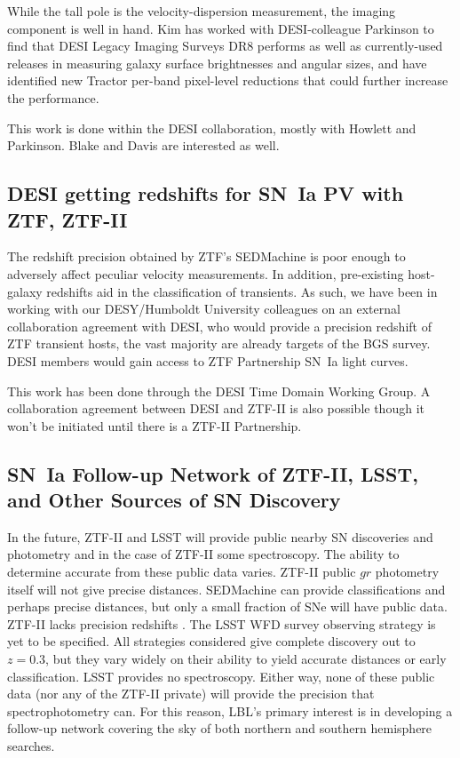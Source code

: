 While the tall pole is the velocity-dispersion measurement, the
imaging component is well in hand. Kim has worked with DESI-colleague Parkinson to find that DESI Legacy Imaging Surveys DR8  performs
as well as currently-used releases in measuring galaxy surface brightnesses and angular sizes, and have identified new Tractor
per-band
pixel-level reductions that could further increase the performance.

This work is done within the DESI collaboration, mostly with Howlett and Parkinson.  Blake and Davis are interested as well.

\subsection{DESI getting redshifts for SN~Ia PV with ZTF, ZTF-II}
The redshift precision obtained by ZTF's SEDMachine is poor enough
to adversely affect peculiar velocity measurements.  In addition, pre-existing host-galaxy redshifts
 aid in the classification of transients.  As such, we have been in working with our DESY/Humboldt University
colleagues on an external collaboration agreement with DESI, who would provide a precision redshift of ZTF transient hosts,
the vast majority are already targets of the BGS survey.   DESI members would gain access to ZTF Partnership
SN~Ia light curves.

This work has been done through the DESI Time Domain Working Group.
A collaboration agreement between DESI and ZTF-II is also possible though it won't be initiated until there is a ZTF-II Partnership.

\subsection{SN~Ia Follow-up Network of ZTF-II, LSST, and Other Sources of SN Discovery}
In the future, ZTF-II and LSST will provide public nearby SN discoveries and photometry and in the case of ZTF-II some spectroscopy.
The ability to determine accurate from these public data varies.  ZTF-II public $gr$ photometry itself will not give precise distances.
SEDMachine can provide classifications and perhaps precise distances, but only a small fraction of SNe will have public data.
ZTF-II lacks precision redshifts .
The LSST WFD survey observing strategy is yet to be specified.  All strategies considered give complete discovery out to $z=0.3$, but
they vary widely on their ability to yield accurate distances or early classification.  LSST provides no spectroscopy. Either way, none of these public data
(nor any of the ZTF-II private) will provide the precision that spectrophotometry can.  For this reason, LBL's primary interest
is in developing a follow-up network covering the sky of both northern and southern hemisphere searches.

